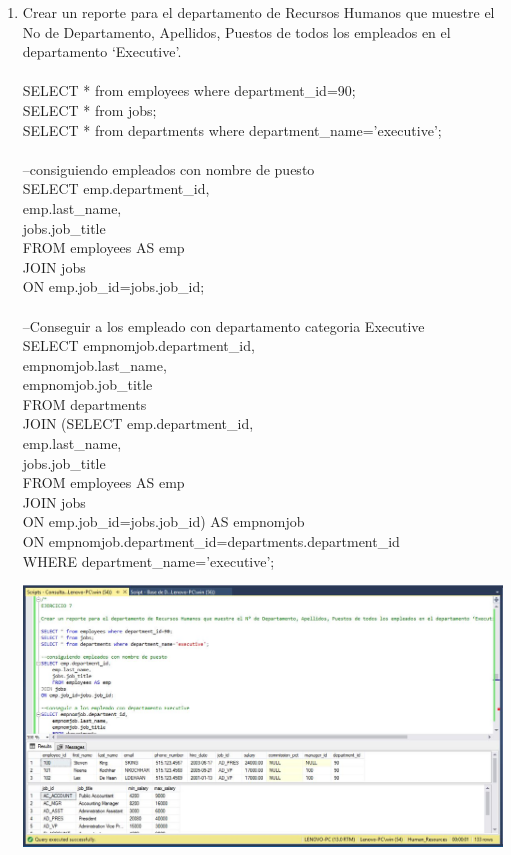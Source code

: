 \begin{enumerate}[1.]
	\item Crear un reporte para el departamento de Recursos Humanos que muestre el No de Departamento, Apellidos, Puestos de todos los empleados en el departamento ‘Executive’.
	\\
	\\SELECT * from employees where department\_id=90;
	\\SELECT * from jobs;
	\\SELECT * from departments where department\_name='executive';
	\\
	\\--consiguiendo empleados con nombre de puesto
	\\SELECT emp.department\_id,
	\\	emp.last\_name,
	\\	jobs.job\_title
	\\	FROM employees AS emp
	\\JOIN jobs
	\\ON emp.job\_id=jobs.job\_id;
	\\
	\\--Conseguir a los empleado con departamento categoria Executive
	\\SELECT empnomjob.department\_id,
	\\	empnomjob.last\_name,
	\\	empnomjob.job\_title
	\\	FROM departments
	\\JOIN (SELECT emp.department\_id,
	\\	emp.last\_name,
	\\	jobs.job\_title	
	\\	FROM employees AS emp
	\\JOIN jobs
	\\	ON emp.job\_id=jobs.job\_id) AS empnomjob
	\\	ON empnomjob.department\_id=departments.department\_id
	\\WHERE department\_name='executive';\\

	\begin{center}
	\includegraphics[width=17cm]{./Imagenes/Actividad9-Ejercicio07} 
	\end{center}

\end{enumerate}
